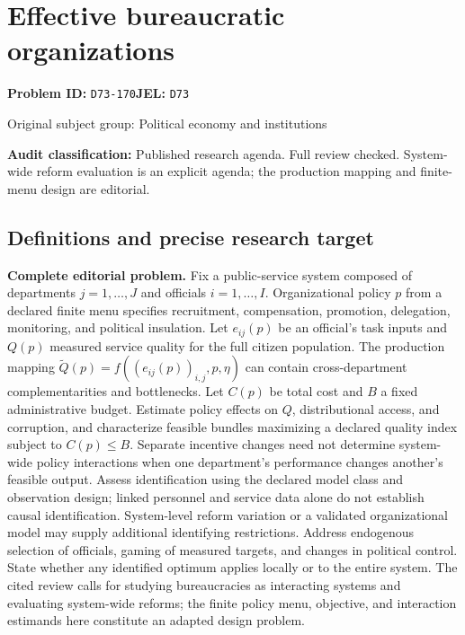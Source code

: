 \documentclass[11pt,a4paper]{article}
\begin{document}
\section*{Effective bureaucratic organizations}
\textbf{Problem ID:} \texttt{D73-170}\quad \textbf{JEL:} \texttt{D73}\par
\label{problem:OP-0382}
\label{audited:ECON-099}
\label{audited:ECON-100}
{\sffamily\small\color{muted}Original subject group: Political economy and institutions\par}
\label{definitions:problem:30007664}
\textbf{Audit classification:} Published research agenda. Full review checked. System-wide reform evaluation is an explicit agenda; the production mapping and finite-menu design are editorial.
\subsection*{Definitions and precise research target}
\textbf{Complete editorial problem.} Fix a public-service system composed of departments \(j=1,\ldots,J\) and officials \(i=1,\ldots,I\). Organizational policy \(p\) from a declared finite menu specifies recruitment, compensation, promotion, delegation, monitoring, and political insulation. Let \(e_{ij}(p)\) be an official's task inputs and \(Q(p)\) measured service quality for the full citizen population. The production mapping \(\widetilde Q(p)=f((e_{ij}(p))_{i,j},p,\eta)\) can contain cross-department complementarities and bottlenecks. Let \(C(p)\) be total cost and \(B\) a fixed administrative budget. Estimate policy effects on \(Q\), distributional access, and corruption, and characterize feasible bundles maximizing a declared quality index subject to \(C(p)\le B\). Separate incentive changes need not determine system-wide policy interactions when one department's performance changes another's feasible output. Assess identification using the declared model class and observation design; linked personnel and service data alone do not establish causal identification. System-level reform variation or a validated organizational model may supply additional identifying restrictions. Address endogenous selection of officials, gaming of measured targets, and changes in political control. State whether any identified optimum applies locally or to the entire system. The cited review calls for studying bureaucracies as interacting systems and evaluating system-wide reforms; the finite policy menu, objective, and interaction estimands here constitute an adapted design problem.
\end{document}
